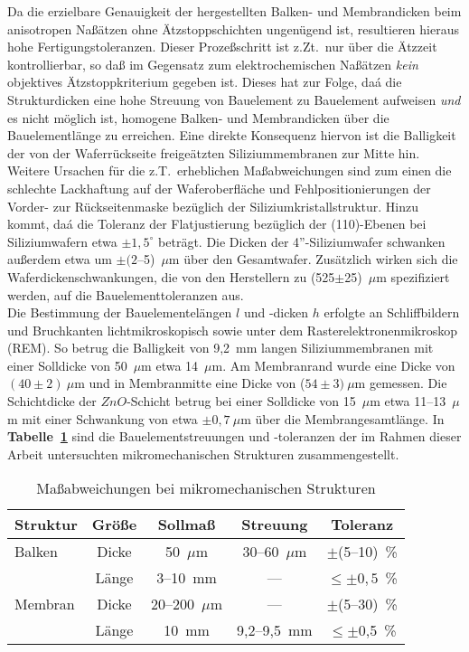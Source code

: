 Da die erzielbare Genauigkeit der hergestellten Balken- und Membrandicken
beim anisotropen Naßätzen ohne Ätzstoppschichten ungenügend ist,
resultieren hieraus hohe Fertigungstoleranzen. Dieser Prozeßschritt ist
z.Zt.\ nur über die Ätzzeit kontrollierbar, so daß im Gegensatz zum
elektrochemischen
Naßätzen {\em kein} objektives Ätzstoppkriterium gegeben ist. Dieses
hat zur Folge, daá die Strukturdicken eine hohe Streuung von Bauelement
zu Bauelement aufweisen {\em und} es nicht möglich ist, homogene Balken- und
Membrandicken über die Bauelementlänge zu erreichen.
Eine direkte Konsequenz hiervon ist die Balligkeit der von der
Waferrückseite freigeätzten Siliziummembranen
zur Mitte hin. Weitere Ursachen für die z.T.\ erheblichen Maßabweichungen
sind zum einen die schlechte Lackhaftung auf der Waferoberfläche und
Fehlpositionierungen der Vorder- zur Rückseitenmaske bezüglich der
Siliziumkristallstruktur. Hinzu kommt, daá die Toleranz der Flatjustierung
bezüglich der (110)-Ebenen bei Siliziumwafern etwa $\pm1,5^{\circ}$ beträgt.
Die Dicken der 4''-Siliziumwafer schwanken außerdem etwa um
$\pm(2$--5)~$\mu$m über den Gesamtwafer. Zusätzlich wirken sich die
Waferdickenschwankungen, die von den Herstellern zu (525$\pm$25)~$\mu$m
spezifiziert werden, auf die Bauelementtoleranzen aus. \\
%
Die Bestimmung der Bauelementelängen $l$ und -dicken $h$ erfolgte
an Schliffbildern und Bruchkanten lichtmikroskopisch sowie unter
dem Rasterelektronenmikroskop (REM).
So betrug die Balligkeit von 9,2~mm langen Siliziummembranen mit einer
Solldicke von 50~$\mu$m etwa 14~$\mu$m. Am Membranrand wurde eine
Dicke von $(40\pm2)~\mu$m und in Membranmitte eine Dicke von
($54\pm3)~\mu$m gemessen. Die Schichtdicke der $ZnO$-Schicht betrug
bei einer Solldicke von 15~$\mu$m etwa 11--13~$\mu$m mit einer Schwankung
von etwa $\pm0,7~\mu$m über die Membrangesamtlänge.
In {\bf Tabelle~\ref{tabgeomfehler}} sind die Bauelementstreuungen und
-toleranzen der im Rahmen dieser Arbeit untersuchten mikromechanischen
Strukturen zusammengestellt.
\begin{table}[htb]
\caption{\label{tabgeomfehler}
 Maßabweichungen bei mikromechanischen Strukturen}
\begin{center}
\begin{tabular}{|l||c|c|c|c|}
\hline
 {\bf Struktur} &  Größe   &  Sollmaß  & Streuung  & Toleranz \\
\hline \hline
 Balken   &  Dicke   &  50~$\mu$m  & 30--60~$\mu$m  &  $\pm$(5--10)~\%   \\
          &  Länge   &  3--10~mm   & ---            &  $\leq \pm0,5$~\%  \\
\hline
 Membran  &  Dicke   &  20--200~$\mu$m   & ---  &  $\pm$(5--30)~\%    \\
          &  Länge   &  10~mm   &  9,2--9,5~mm  &  $\leq \pm$0,5~\%   \\
\hline
\end{tabular}
\end{center}
\end{table}
